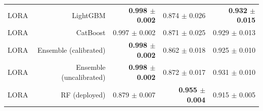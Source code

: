 \begin{table}[htbp]
\begin{tabular}{lrrrr}
LORA & LightGBM & \textbf{0.998 $\pm$ 0.002} & 0.874 $\pm$ 0.026 & \textbf{0.932 $\pm$ 0.015} \\
LORA & CatBoost & 0.997 $\pm$ 0.002 & 0.871 $\pm$ 0.025 & 0.929 $\pm$ 0.013 \\
LORA & Ensemble (calibrated) & \textbf{0.998 $\pm$ 0.002} & 0.862 $\pm$ 0.018 & 0.925 $\pm$ 0.010 \\
LORA & Ensemble (uncalibrated) & \textbf{0.998 $\pm$ 0.002} & 0.872 $\pm$ 0.017 & 0.931 $\pm$ 0.010 \\
LORA & RF (deployed) & 0.879 $\pm$ 0.007 & \textbf{0.955 $\pm$ 0.004} & 0.915 $\pm$ 0.005 \\
\bottomrule
\end{tabular}
\end{table}
